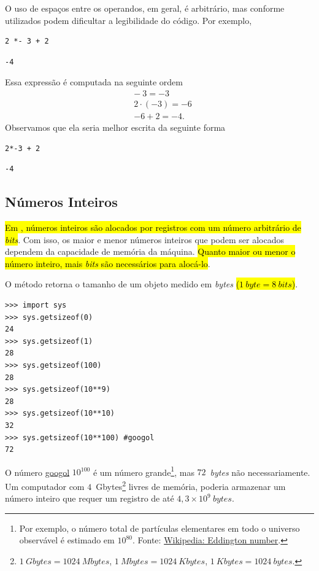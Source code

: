 \begin{obs}
  O uso de espaços entre os operandos, em geral, é arbitrário, mas conforme utilizados podem dificultar a legibilidade do código. Por exemplo,
\begin{lstlisting}
2 *- 3 + 2
\end{lstlisting}

\begin{verbatim}
-4
\end{verbatim}

  Essa expressão é computada na seguinte ordem
  \begin{align}
    &-~3 = -3\\
    &2\cdot(-3) = -6\\
    &-6 + 2 = -4.
  \end{align}
  Observamos que ela seria melhor escrita da seguinte forma

\begin{lstlisting}
2*-3 + 2
\end{lstlisting}

\begin{verbatim}
-4
\end{verbatim}

\end{obs}

\subsection{Números Inteiros}

\hl{Em {\python}, números inteiros são alocados por registros com um número arbitrário de \textit{bits}}. Com isso, os maior e menor números inteiros que podem ser alocados dependem da capacidade de memória da máquina. \hl{Quanto maior ou menor o número inteiro, mais \textit{bits} são necessários para alocá-lo}.

\begin{ex}
  O método {\python} {\PYTHONsysDOTgetsizeof} retorna o tamanho de um objeto medido em \textit{bytes} \hl{($1~\textit{byte} = 8~\textit{bits}$)}.

\begin{lstlisting}
>>> import sys
>>> sys.getsizeof(0)
24
>>> sys.getsizeof(1)
28
>>> sys.getsizeof(100)
28
>>> sys.getsizeof(10**9)
28
>>> sys.getsizeof(10**10)
32
>>> sys.getsizeof(10**100) #googol
72
\end{lstlisting}

  O número \href{https://en.wikipedia.org/wiki/Googol}{googol} $10^{100}$ é um número grande\footnote{Por exemplo, o número total de partículas elementares em todo o universo observável é estimado em $10^{80}$. Fonte: \href{https://en.wikipedia.org/wiki/Eddington_number}{Wikipedia: Eddington number}.}, mas $72$~\textit{bytes} não necessariamente. Um computador com $4$~Gbytes\footnote{$1~\textit{Gbytes} = 1024~\textit{Mbytes}$, $1~\textit{Mbytes} = 1024~\textit{Kbytes}$, $1~\textit{Kbytes} = 1024~\textit{bytes}$.} livres de memória, poderia armazenar um número inteiro que requer um registro de até $4,3\times 10^9~\textit{bytes}$.
\end{ex}

